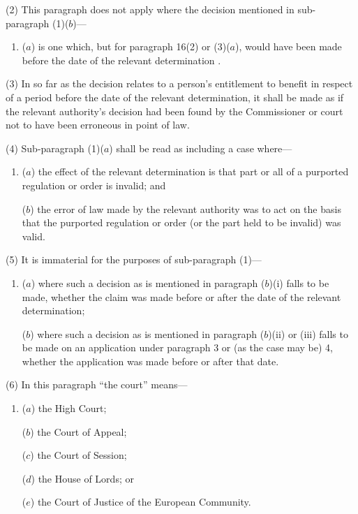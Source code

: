 \documentclass[12pt,a4paper]{article}
\begin{document}
(2) This paragraph does not apply where the decision mentioned in sub-paragraph (1)($b$)—
\begin{enumerate}\item[]
($a$) is one which, but for paragraph 16(2)  or (3)($a$), would have been made before the date of the relevant determination%
%
.
\end{enumerate}

(3) In so far as the decision relates to a person’s entitlement to benefit in respect of a period before the date of the relevant determination, it shall be made as if the relevant authority’s decision had been found by the Commissioner or court not to have been erroneous in point of law.

(4) Sub-paragraph (1)($a$)  shall be read as including a case where—
\begin{enumerate}\item[]
($a$) the effect of the relevant determination is that part or all of a purported regulation or order is invalid; and

($b$) the error of law made by the relevant authority was to act on the basis that the purported regulation or order (or the part held to be invalid) was valid.
\end{enumerate}

(5) It is immaterial for the purposes of sub-paragraph (1)—
\begin{enumerate}\item[]
($a$) where such a decision as is mentioned in paragraph ($b$)(i)  falls to be made, whether the claim was made before or after the date of the relevant determination;

($b$) where such a decision as is mentioned in paragraph ($b$)(ii)  or (iii)  falls to be made on an application under paragraph 3 or (as the case may be) 4, whether the application was made before or after that date.
\end{enumerate}

(6) In this paragraph “the court” means—
\begin{enumerate}\item[]
($a$) the High Court;

($b$) the Court of Appeal;

($c$) the Court of Session;

($d$) the House of Lords; or

($e$) the Court of Justice of the European Community.
\end{enumerate}
\end{document}
